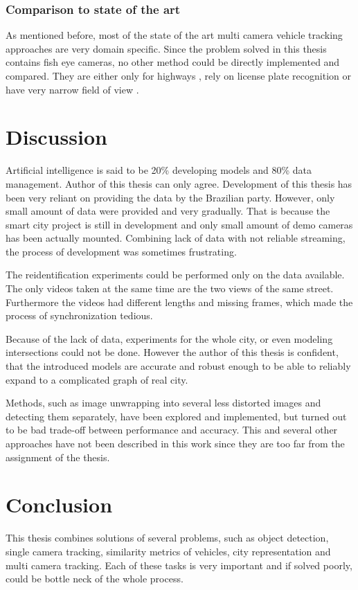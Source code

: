 \documentclass[a4paper,12pt,titlepage, twoside]{article}
\numberwithin{figure}{section}
\begin{document}
\subsubsection{Comparison to state of the art}

As mentioned before, most of the state of the art multi camera vehicle tracking approaches are very domain specific. Since the problem solved in this thesis contains fish eye cameras, no other method could be directly implemented and compared. They are either only for highways \cite{coifman2007vehicle, kuhne1991freeway}, rely on license plate recognition \cite{arth2007real, du2013automatic} or have very narrow field of view \cite{matei2011vehicle}.

\clearpage
\section{Discussion}
Artificial intelligence is said to be 20\% developing models and 80\% data management. Author of this thesis can only agree. Development of this thesis has been very reliant on providing the data by the Brazilian party. However, only small amount of data were provided and very gradually. That is because the smart city project is still in development and only small amount of demo cameras has been actually mounted. Combining lack of data with not reliable streaming, the process of development was sometimes frustrating. 

The reidentification experiments could be performed only on the data available. The only videos taken at the same time are the two views of the same street. Furthermore the videos had different lengths and missing frames, which made the process of synchronization tedious. 

Because of the lack of data, experiments for the whole city, or even modeling intersections could not be done. However the author of this thesis is confident, that the introduced models are accurate and robust enough to be able to reliably expand to a complicated graph of real city.

Methods, such as image unwrapping into several less distorted images and detecting them separately, have been explored and implemented, but turned out to be bad trade-off between performance and accuracy. This and several other approaches have not been described in this work since they are too far from the assignment of the thesis.

\clearpage
\section{Conclusion}
This thesis combines solutions of several problems, such as object detection, single camera tracking, similarity metrics of vehicles, city representation and multi camera tracking. Each of these tasks is very important and if solved poorly, could be bottle neck of the whole process.
\end{document}
